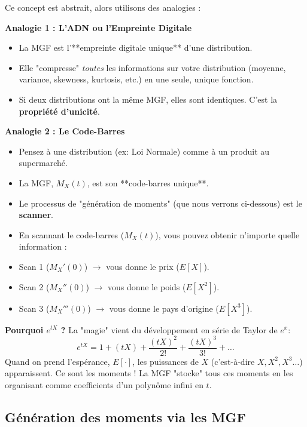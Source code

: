 \begin{intuitionbox}
Ce concept est abstrait, alors utilisons des analogies :

\textbf{Analogie 1 : L'ADN ou l'Empreinte Digitale}
\begin{itemize}
    \item La MGF est l'**empreinte digitale unique** d'une distribution.
    \item Elle "compresse" \textit{toutes} les informations sur votre distribution (moyenne, variance, skewness, kurtosis, etc.) en une seule, unique fonction.
    \item Si deux distributions ont la même MGF, elles sont identiques. C'est la \textbf{propriété d'unicité}.
\end{itemize}

\textbf{Analogie 2 : Le Code-Barres}
\begin{itemize}
    \item Pensez à une distribution (ex: Loi Normale) comme à un produit au supermarché.
    \item La MGF, $M_X(t)$, est son **code-barres unique**.
    \item Le processus de "génération de moments" (que nous verrons ci-dessous) est le \textbf{scanner}.
    \item En scannant le code-barres ($M_X(t)$), vous pouvez obtenir n'importe quelle information :
        \item Scan 1 ($M_X'(0)$) $\to$ vous donne le prix ($E[X]$).
        \item Scan 2 ($M_X''(0)$) $\to$ vous donne le poids ($E[X^2]$).
        \item Scan 3 ($M_X'''(0)$) $\to$ vous donne le pays d'origine ($E[X^3]$).
\end{itemize}

\textbf{Pourquoi $e^{tX}$ ?}
La "magie" vient du développement en série de Taylor de $e^x$:
$$ e^{tX} = 1 + (tX) + \frac{(tX)^2}{2!} + \frac{(tX)^3}{3!} + \dots $$
Quand on prend l'espérance, $E[\cdot]$, les puissances de $X$ (c'est-à-dire $X, X^2, X^3\dots$) apparaissent. Ce sont les moments ! La MGF "stocke" tous ces moments en les organisant comme coefficients d'un polynôme infini en $t$.
\end{intuitionbox}

\subsection{Génération des moments via les MGF}

